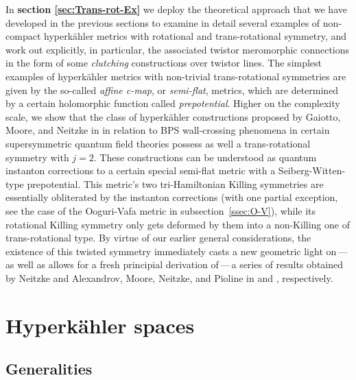 \documentclass[11pt]{amsart}
\theoremstyle{remark}
\theoremstyle{remark}
\theoremstyle{definition}
\theoremstyle{definition}
\theoremstyle{definition}
\newcommand{\0}{{\scriptstyle 0'}} %
\newcommand{\1}{{\scriptstyle 1'}}
\begin{document}
In \textbf{section \ref{sec:Trans-rot-Ex}} we deploy the theoretical approach that we have developed in the previous sections to examine in detail several examples of non-compact hyperk\"ahler metrics with rotational and trans-rotational symmetry, and work out explicitly, in particular, the associated  twistor meromorphic connections in the form of some \textit{clutching} constructions over twistor lines. The simplest examples of hyperk\"ahler metrics with non-trivial trans-rotational symmetries are given by the so-called \textit{affine c-map}, or \textit{semi-flat}, metrics, which are determined by a certain holomorphic function called \textit{prepotential}. Higher on the complexity scale, we show that the class of hyperk\"ahler constructions proposed by Gaiotto, Moore, and Neitzke in \cite{MR2672801} in relation to BPS wall-crossing phenomena in certain supersymmetric quantum field theories possess as well a trans-rotational symmetry with \mbox{$j=2$}. These constructions can be understood as quantum instanton corrections to a certain special semi-flat metric with a Seiberg-Witten-type prepotential. This metric's two tri-Hamiltonian Killing symmetries are essentially obliterated by the instanton corrections (with one partial exception, see the case of the Ooguri-Vafa metric in subsection~\ref{ssec:O-V}), while its rotational Killing symmetry only gets  deformed by them into a non-Killing one of trans-rotational type. By virtue of our earlier general considerations, the existence of this twisted symmetry immediately casts a new geometric light on\,---\,as well as allows for a fresh principial derivation of\,---\,a series of results obtained by Neitzke and Alexandrov, Moore, Neitzke, and Pioline in \cite{Neitzke:2011za} and \cite{Alexandrov:2014wca}, respectively. 





\section{Hyperk\"ahler spaces} \label{sec:HK-sp}


\subsection{Generalities} \hfill \medskip
\end{document}
